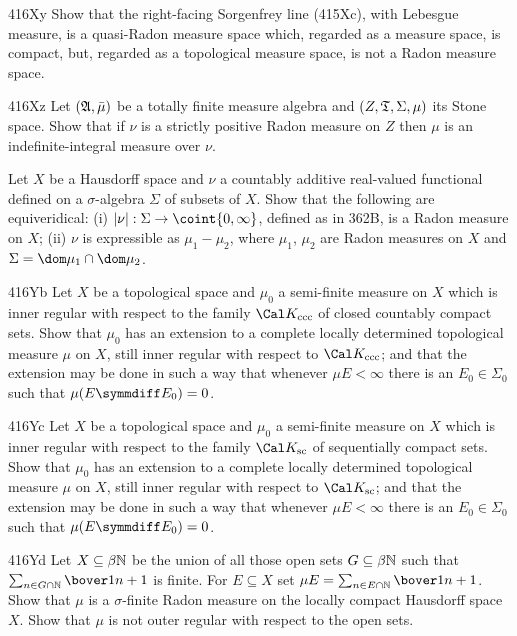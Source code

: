 {\spheader 416Xy Show that the right-facing Sorgenfrey line (415Xc), with
Lebesgue measure, is a
quasi-Radon measure space which, regarded as a measure space, is
compact, but, regarded as a topological measure space, is not a Radon
measure space.

\spheader 416Xz Let $(\frak A,\bar\mu)$ be a totally finite measure
algebra and $(Z,\frak T,\Sigma,\mu)$ its Stone space.
Show that if $\nu$ is a strictly positive Radon measure on $Z$ then $\mu$
is an indefinite-integral measure over $\nu$.

Let $X$ be a Hausdorff space and $\nu$ a countably additive real-valued
functional defined on a $\sigma$-algebra $\Sigma$ of subsets of $X$.
Show that the following are equiveridical:  (i)
$|\nu|:\Sigma\to\coint{0,\infty}$,
defined as in 362B, is a Radon measure on $X$;  (ii) $\nu$ is
expressible as $\mu_1-\mu_2$, where $\mu_1$, $\mu_2$ are Radon measures
on $X$ and $\Sigma=\dom\mu_1\cap\dom\mu_2$.

\spheader 416Yb Let $X$ be a topological space and $\mu_0$ a semi-finite
measure on $X$ which is inner regular with respect to the family
$\Cal K_{\text{ccc}}$ of closed countably compact sets.   Show that $\mu_0$
has an extension to a complete locally determined topological measure
$\mu$ on $X$, still inner regular with respect to $\Cal K_{\text{ccc}}$;
and that the extension may be done in such a way that whenever
$\mu E<\infty$ there
is an $E_0\in\Sigma_0$ such that $\mu(E\symmdiff E_0)=0$.   

\spheader 416Yc Let $X$ be a topological space and $\mu_0$ a semi-finite
measure on $X$ which is inner regular with respect to the family
$\Cal K_{\text{sc}}$ of sequentially compact sets.   Show that $\mu_0$
has an extension to a complete locally determined topological measure
$\mu$ on $X$, still inner regular with respect to $\Cal K_{\text{sc}}$;
and that the extension may be done in such a way that whenever
$\mu E<\infty$
there is an $E_0\in\Sigma_0$ such that $\mu(E\symmdiff E_0)=0$.

\spheader 416Yd Let $X\subseteq\beta\Bbb N$ be the union of all those
open sets $G\subseteq\beta\Bbb N$ such that
$\sum_{n\in G\cap\Bbb N}\bover1{n+1}$ is finite.   For $E\subseteq X$
set $\mu E=\sum_{n\in E\cap\Bbb N}\bover1{n+1}$.   Show that $\mu$ is a
$\sigma$-finite Radon
measure on the locally compact Hausdorff space $X$.   Show that $\mu$ is
not outer regular with respect to the open sets.

}
